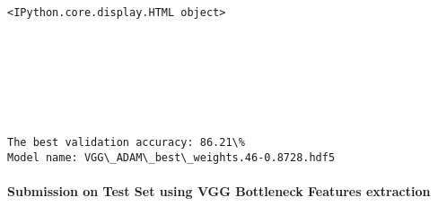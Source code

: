 \documentclass[11pt]{article}
\begin{document}
    
    \begin{verbatim}
<IPython.core.display.HTML object>
    \end{verbatim}

    
    \begin{Verbatim}[commandchars=\\\{\}]



    \end{Verbatim}

    \begin{center}
    \end{center}
    { \hspace*{\fill} \\}
    
    \begin{Verbatim}[commandchars=\\\{\}]


The best validation accuracy: 86.21\% 
Model name: VGG\_ADAM\_best\_weights.46-0.8728.hdf5

    \end{Verbatim}

    \hypertarget{submission-on-test-set-using-vgg-bottleneck-features-extraction}{%
\paragraph{Submission on Test Set using VGG Bottleneck Features
extraction}\label{submission-on-test-set-using-vgg-bottleneck-features-extraction}}
\end{document}
